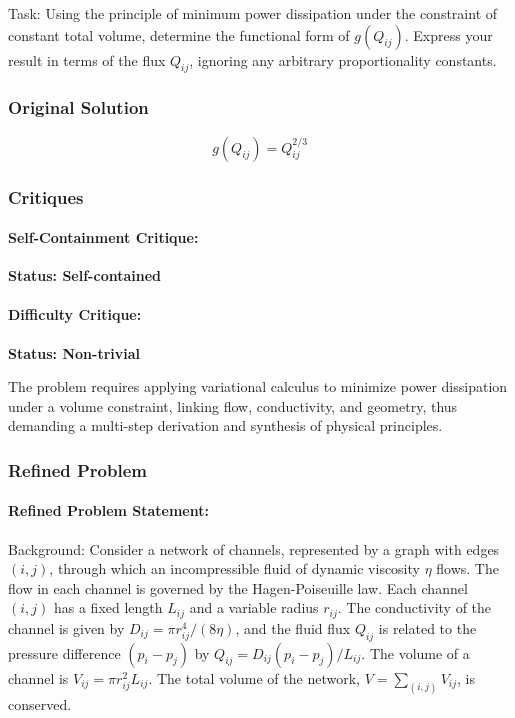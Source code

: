 \documentclass[10pt]{article}
\begin{document}
Task:
Using the principle of minimum power dissipation under the constraint of constant total volume, determine the functional form of $g(Q_{ij})$. Express your result in terms of the flux $Q_{ij}$, ignoring any arbitrary proportionality constants.

\subsubsection*{Original Solution}
\[ g(Q_{ij}) = Q_{ij}^{2/3} \]

\subsubsection*{Critiques}
\paragraph*{Self-Containment Critique:}
\textcolor{pass}{\textbf{Status: Self-contained}}




\paragraph*{Difficulty Critique:}
\textcolor{pass}{\textbf{Status: Non-trivial}}

The problem requires applying variational calculus to minimize power dissipation under a volume constraint, linking flow, conductivity, and geometry, thus demanding a multi-step derivation and synthesis of physical principles.


\subsubsection*{Refined Problem}
\paragraph*{Refined Problem Statement:}
Background:
Consider a network of channels, represented by a graph with edges $(i,j)$, through which an incompressible fluid of dynamic viscosity $\eta$ flows. The flow in each channel is governed by the Hagen-Poiseuille law. Each channel $(i,j)$ has a fixed length $L_{ij}$ and a variable radius $r_{ij}$. The conductivity of the channel is given by $D_{ij} = \pi r_{ij}^4 / (8\eta)$, and the fluid flux $Q_{ij}$ is related to the pressure difference $(p_i - p_j)$ by $Q_{ij} = D_{ij}(p_i - p_j)/L_{ij}$. The volume of a channel is $V_{ij} = \pi r_{ij}^2 L_{ij}$. The total volume of the network, $V = \sum_{(i,j)} V_{ij}$, is conserved.
\end{document}
